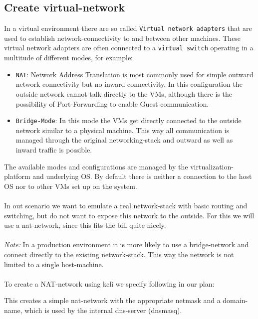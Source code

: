 \subsection{Create virtual-network}
In a virtual environment there are so called \texttt{Virtual network adapters} that are used to establish network-connectivity to and between other machines. These virtual network adapters are often connected to a \texttt{virtual switch} operating in a multitude of different modes, for example:
\begin{itemize}
	\item \texttt{NAT}: Network Address Translation is most commonly used for simple outward network connectivity but no inward connectivity. In this configuration the outside network cannot talk directly to the VMs, although there is the possibility of Port-Forwarding to enable Guest communication.
	\item \texttt{Bridge-Mode}: In this mode the VMs get directly connected to the outside network similar to a physical machine. This way all communication is managed through the original networking-stack and outward as well as inward traffic is possible.
\end{itemize}
The available modes and configurations are managed by the virtualization-platform and underlying OS.
By default there is neither a connection to the host OS nor to other VMs set up on the system.\\\\In out scenario we want to emulate a real network-stack with basic routing and switching, but do not want to expose this network to the outside. For this we will use a nat-network, since this fits the bill quite nicely.\\\\\textit{Note:} In a production environment it is more likely to use a bridge-network and connect directly to the existing network-stack. This way the network is not limited to a single host-machine.\\\\To create a NAT-network using kcli we specify following in our plan:

This creates a simple nat-network with the appropriate netmask and a domain-name, which is used by the internal dns-server (dnsmasq).
